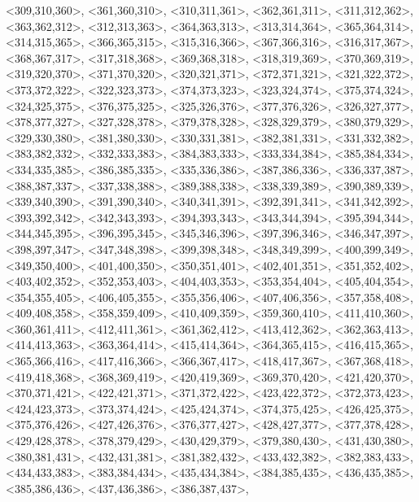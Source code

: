 \documentclass[a4paper,10pt]{article}
\begin{document}
\begin{eulernotebook}
\begin{euleroutput}
  <309,310,360>,
  <361,360,310>,
  <310,311,361>,
  <362,361,311>,
  <311,312,362>,
  <363,362,312>,
  <312,313,363>,
  <364,363,313>,
  <313,314,364>,
  <365,364,314>,
  <314,315,365>,
  <366,365,315>,
  <315,316,366>,
  <367,366,316>,
  <316,317,367>,
  <368,367,317>,
  <317,318,368>,
  <369,368,318>,
  <318,319,369>,
  <370,369,319>,
  <319,320,370>,
  <371,370,320>,
  <320,321,371>,
  <372,371,321>,
  <321,322,372>,
  <373,372,322>,
  <322,323,373>,
  <374,373,323>,
  <323,324,374>,
  <375,374,324>,
  <324,325,375>,
  <376,375,325>,
  <325,326,376>,
  <377,376,326>,
  <326,327,377>,
  <378,377,327>,
  <327,328,378>,
  <379,378,328>,
  <328,329,379>,
  <380,379,329>,
  <329,330,380>,
  <381,380,330>,
  <330,331,381>,
  <382,381,331>,
  <331,332,382>,
  <383,382,332>,
  <332,333,383>,
  <384,383,333>,
  <333,334,384>,
  <385,384,334>,
  <334,335,385>,
  <386,385,335>,
  <335,336,386>,
  <387,386,336>,
  <336,337,387>,
  <388,387,337>,
  <337,338,388>,
  <389,388,338>,
  <338,339,389>,
  <390,389,339>,
  <339,340,390>,
  <391,390,340>,
  <340,341,391>,
  <392,391,341>,
  <341,342,392>,
  <393,392,342>,
  <342,343,393>,
  <394,393,343>,
  <343,344,394>,
  <395,394,344>,
  <344,345,395>,
  <396,395,345>,
  <345,346,396>,
  <397,396,346>,
  <346,347,397>,
  <398,397,347>,
  <347,348,398>,
  <399,398,348>,
  <348,349,399>,
  <400,399,349>,
  <349,350,400>,
  <401,400,350>,
  <350,351,401>,
  <402,401,351>,
  <351,352,402>,
  <403,402,352>,
  <352,353,403>,
  <404,403,353>,
  <353,354,404>,
  <405,404,354>,
  <354,355,405>,
  <406,405,355>,
  <355,356,406>,
  <407,406,356>,
  <357,358,408>,
  <409,408,358>,
  <358,359,409>,
  <410,409,359>,
  <359,360,410>,
  <411,410,360>,
  <360,361,411>,
  <412,411,361>,
  <361,362,412>,
  <413,412,362>,
  <362,363,413>,
  <414,413,363>,
  <363,364,414>,
  <415,414,364>,
  <364,365,415>,
  <416,415,365>,
  <365,366,416>,
  <417,416,366>,
  <366,367,417>,
  <418,417,367>,
  <367,368,418>,
  <419,418,368>,
  <368,369,419>,
  <420,419,369>,
  <369,370,420>,
  <421,420,370>,
  <370,371,421>,
  <422,421,371>,
  <371,372,422>,
  <423,422,372>,
  <372,373,423>,
  <424,423,373>,
  <373,374,424>,
  <425,424,374>,
  <374,375,425>,
  <426,425,375>,
  <375,376,426>,
  <427,426,376>,
  <376,377,427>,
  <428,427,377>,
  <377,378,428>,
  <429,428,378>,
  <378,379,429>,
  <430,429,379>,
  <379,380,430>,
  <431,430,380>,
  <380,381,431>,
  <432,431,381>,
  <381,382,432>,
  <433,432,382>,
  <382,383,433>,
  <434,433,383>,
  <383,384,434>,
  <435,434,384>,
  <384,385,435>,
  <436,435,385>,
  <385,386,436>,
  <437,436,386>,
  <386,387,437>,

\end{euleroutput}
\end{eulernotebook}
\end{document}
